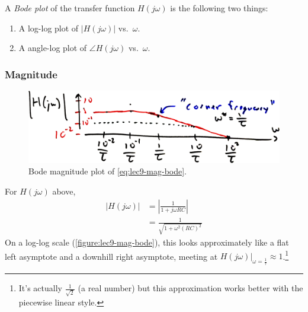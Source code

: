 A \emph{Bode plot} of the transfer function \(H(j\omega)\) is the following two things:
\begin{enumerate}
  \item A log-log plot of \(\left|H(j\omega)\right|\) vs.\ \(\omega\).
  \item A angle-log plot of \(\angle H(j\omega)\) vs.\ \(\omega\).
\end{enumerate}

\subsubsection{Magnitude}
\begin{figure}
  \centering
  \includegraphics[width=0.7\linewidth]{figures/9/magnitude-bode}
  \caption{Bode magnitude plot of \autoref{eq:lec9-mag-bode}.}
  \label{figure:lec9-mag-bode}
\end{figure}
For \(H(j\omega)\) above,
\begin{align}
  \left|H(j\omega)\right|
  &= \left| \frac{1}{1 + j\omega RC} \right| \\
  &= \frac{1}{\sqrt{1 + \omega^2 (RC)^2}}
\end{align}
On a log-log scale (\autoref{figure:lec9-mag-bode}), this looks approximately like a flat left asymptote and a downhill right asymptote, meeting at \(\left.H(j\omega)\right\rvert_{\omega = \frac{1}{\tau}} \approx 1\).\footnote{It's actually \(\frac{1}{\sqrt 2}\) (a real number) but this approximation works better with the piecewise linear style.}

